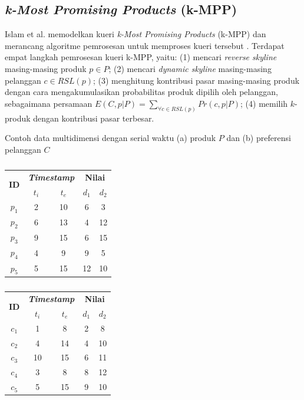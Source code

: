 \documentclass[conference]{IEEEtran}
\begin{document}
\subsection{\textit{k-Most Promising Products} (k-MPP)}
Islam et al. memodelkan kueri \textit{k-Most Promising Products} (k-MPP) dan merancang algoritme pemrosesan untuk memproses kueri tersebut \cite{kmpp}. Terdapat empat langkah pemrosesan kueri k-MPP, yaitu: (1) mencari \textit{reverse skyline} masing-masing produk  $p \in P$; (2) mencari \textit{dynamic skyline} masing-masing pelanggan $c \in RSL(p)$; (3) menghitung kontribusi pasar masing-masing produk dengan cara mengakumulasikan probabilitas produk dipilih oleh pelanggan, sebagaimana persamaan $E(C, p|P) = \sum_{\forall c \in RSL(p)} Pr(c, p|P)$; (4) memilih $k$-produk dengan kontribusi pasar terbesar.

\begin{table}[htbp]
	\caption{Contoh data multidimensi dengan serial waktu (a) produk $P$ dan (b) preferensi pelanggan $C$ \label{tab:dataset}}
	\begin{subtable}{.5\linewidth}
		\small
		\centering
		\caption{}
		\begin{tabular}{|c|c|c|c|c|}
			\hline
			\multirow{2}{*}{\textbf{ID}} & \multicolumn{2}{c|}{\textbf{\textit{Timestamp}}} & \multicolumn{2}{c|}{\textbf{Nilai}} \\ \cline{2-5}
			& \textbf{$t_i$} & \textbf{$t_e$} & \textbf{$d_1$} & \textbf{$d_2$}\\ \hline \hline
			$p_1$ & 2 & 10 & 6 & 3 \\ \hline
			$p_2$ & 6 & 13 & 4 & 12 \\ \hline
			$p_3$ & 9 & 15 & 6 & 15 \\ \hline
			$p_4$ & 4 & 9 & 9 & 5 \\ \hline
			$p_5$ & 5 & 15 & 12 & 10 \\ \hline
		\end{tabular}
	\end{subtable}%
	\begin{subtable}{.5\linewidth}
		\small
		\centering
		\caption{}
		\begin{tabular}{|c|c|c|c|c|}
			\hline
			\multirow{2}{*}{\textbf{ID}} & \multicolumn{2}{c|}{\textbf{\textit{Timestamp}}} & \multicolumn{2}{c|}{\textbf{Nilai}} \\ \cline{2-5}
			& \textbf{$t_i$} & \textbf{$t_e$} & \textbf{$d_1$} & \textbf{$d_2$}\\ \hline \hline
			$c_1$ & 1 & 8 & 2 & 8 \\ \hline
			$c_2$ & 4 & 14 & 4 & 10\\ \hline
			$c_3$ & 10 & 15 & 6 & 11\\ \hline
			$c_4$ & 3 & 8 & 8 & 12\\ \hline
			$c_5$ & 5 & 15 & 9 & 10\\ \hline
		\end{tabular}
	\end{subtable} 
\end{table}
\end{document}
